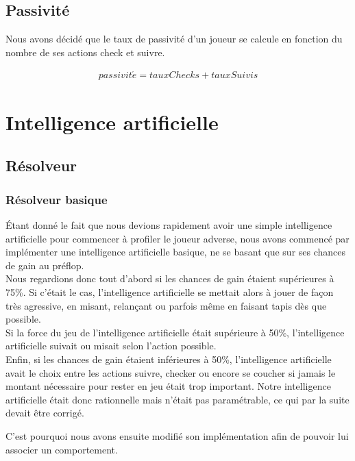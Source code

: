 \documentclass{report}
\begin{document}
\section{Passivité}

\hspace{0.5cm}Nous avons décidé que le taux de passivité d'un joueur se calcule en fonction du nombre de ses actions check et suivre.\par
\begin{align*}
	passivit\acute{e}=tauxChecks+tauxSuivis
\end{align*}


\chapter{Intelligence artificielle}
\section{Résolveur}
\subsection{Résolveur basique}


Étant donné le fait que nous devions rapidement avoir une simple intelligence artificielle pour commencer à profiler le joueur adverse, nous avons commencé par implémenter une intelligence artificielle basique, ne se basant que sur ses chances de gain au préflop.\\

Nous regardions donc tout d'abord si les chances de gain étaient supérieures à 75\%. Si c'était le cas, l'intelligence artificielle se mettait alors à jouer de façon très agressive, en misant, relançant ou parfois même en faisant tapis dès que possible.\\

Si la force du jeu de l'intelligence artificielle était supérieure à 50\%, l'intelligence artificielle suivait ou misait selon l'action possible.\\

Enfin, si les chances de gain étaient inférieures à 50\%, l'intelligence artificielle avait le choix entre les actions suivre, checker ou encore se coucher si jamais le montant nécessaire pour rester en jeu était trop important. Notre intelligence artificielle était donc rationnelle mais n'était pas paramétrable, ce qui par la suite devait être corrigé. \par
C'est pourquoi nous avons ensuite modifié son implémentation afin de pouvoir lui associer un comportement.\par
\end{document}
